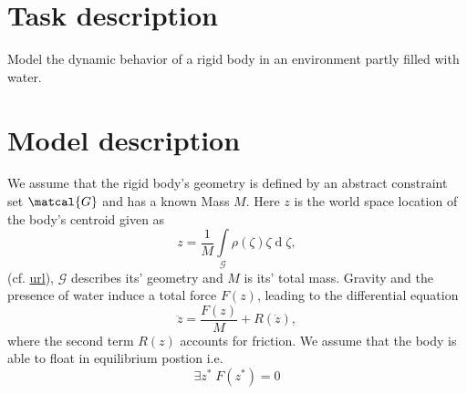 
\tableofcontents
\section{Task description}
Model the dynamic behavior of a rigid body in an environment partly filled with water.

\section{Model description}
We assume that the rigid body's geometry is defined by an abstract constraint set $\matcal{G}$ and has a known Mass $M$.  
Here $z$ is the world space location of the body's centroid given as
$$z = \frac{1}{M} \int\limits_{\mathcal{G}} \rho(\zeta) \zeta \operatorname{d} \zeta, $$
(cf.  \href{http://en.wikipedia.org/w/index.php?title=Center\_of\_mass&action=edit&section=4}{url}),
$\mathcal{G}$ describes its' geometry and $M$ is its' total mass. 
Gravity and the presence of water induce a total force $F(z)$, leading to the differential equation
\begin{equation}
\ddot{z} = \frac{F(z)}{M} + R(\dot{z}),  
\label{eq:eom}
\end{equation}
where the second term $R(z)$ accounts for friction.
We assume that the body is able to float in equilibrium postion i.e.
$$\exists z^* \; F(z^*) = 0$$

